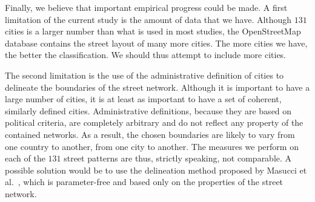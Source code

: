 Finally, we believe that important empirical progress could be made. A first
limitation of the current study is the amount of data that we have. Although
$131$ cities is a larger number than what is used in most studies, the
OpenStreetMap database contains the street layout of many more cities. The more
cities we have, the better the classification. We should thus attempt to include
more cities.

The second limitation is the use of the administrative definition of cities to
delineate the boundaries of the street network. Although it is important to have
a large number of cities, it is at least as important to have a set of coherent,
similarly defined cities. Administrative definitions,
because they are based on political criteria, are completely arbitrary and do
not reflect any property of the contained networks. As a result, the chosen
boundaries are likely to vary from one country to another, from one city to
another. The measures we perform on each of the $131$ street patterns are thus, strictly
speaking, not comparable. A possible solution would be to use the delineation
method proposed by Masucci et al.~\cite{Masucci:2015}, which is parameter-free
and based only on the properties of the street network.
